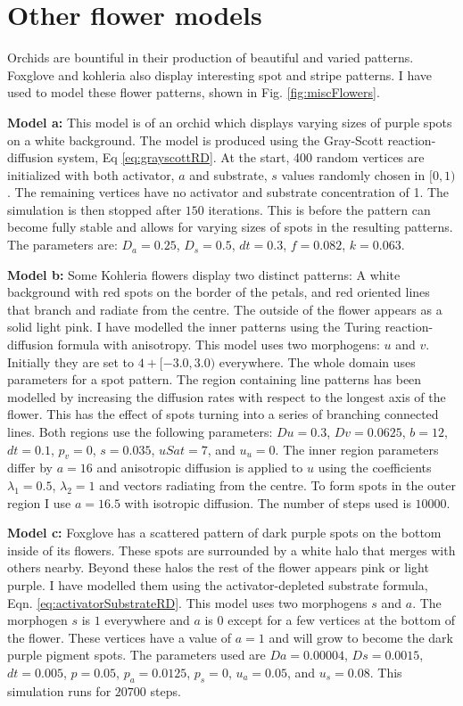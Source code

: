 \section{Other flower models}
Orchids are bountiful in their production of beautiful and varied patterns. Foxglove and kohleria also display interesting spot and stripe patterns. I have used \ProgramName{} to model these flower patterns, shown in Fig. \ref{fig:miscFlowers}.

\textbf{Model a:} 
This model is of an orchid which displays varying sizes of purple spots on a white background. The model is produced using the Gray-Scott reaction-diffusion system, Eq \ref{eq:grayscottRD}. At the start, 400 random vertices are initialized with both activator, $a$ and substrate, $s$ values randomly chosen in $[0, 1)$. The remaining vertices have no activator and substrate concentration of 1. The simulation is then stopped after $150$ iterations. This is before the pattern can become fully stable and allows for varying sizes of spots in the resulting patterns. The parameters are: $D_a = 0.25$, $D_s = 0.5$, $dt = 0.3$, $f = 0.082$, $k = 0.063$.

\textbf{Model b:}
Some Kohleria flowers display two distinct patterns: A white background with red spots on the border of the petals, and red oriented lines that branch and radiate from the centre. The outside of the flower appears as a solid light pink. I have modelled the inner patterns using the Turing reaction-diffusion formula with anisotropy. This model uses two morphogens: $u$ and $v$. Initially they are set to $4 + [-3.0, 3.0)$ everywhere. The whole domain uses parameters for a spot pattern. The region containing line patterns has been modelled by increasing the diffusion rates with respect to the longest axis of the flower. This has the effect of spots turning into a series of branching connected lines. Both regions use the following parameters: $Du=0.3$, $Dv=0.0625$, $b=12$, $dt=0.1$, $p_v=0$, $s=0.035$, $uSat=7$, and $u_u=0$. The inner region parameters differ by $a=16$ and anisotropic diffusion is applied to $u$ using the coefficients $\lambda_{1}=0.5$, $\lambda_{2}=1$ and vectors radiating from the centre. To form spots in the outer region I use $a=16.5$ with isotropic diffusion. The number of steps used is $10000$.

\textbf{Model c:}
Foxglove has a scattered pattern of dark purple spots on the bottom inside of its flowers. These spots are surrounded by a white halo that merges with others nearby. Beyond these halos the rest of the flower appears pink or light purple. I have modelled them using the activator-depleted substrate formula, Eqn. \ref{eq:activatorSubstrateRD}. This model uses two morphogens $s$ and $a$. The morphogen $s$ is $1$ everywhere and $a$ is $0$ except for a few vertices at the bottom of the flower. These vertices have a value of $a=1$ and will grow to become the dark purple pigment spots. The parameters used are $Da=0.00004$, $Ds=0.0015$, $dt=0.005$, $p=0.05$, $p_a=0.0125$, $p_s=0$, $u_a=0.05$, and $u_s=0.08$. This simulation runs for $20700$ steps.

